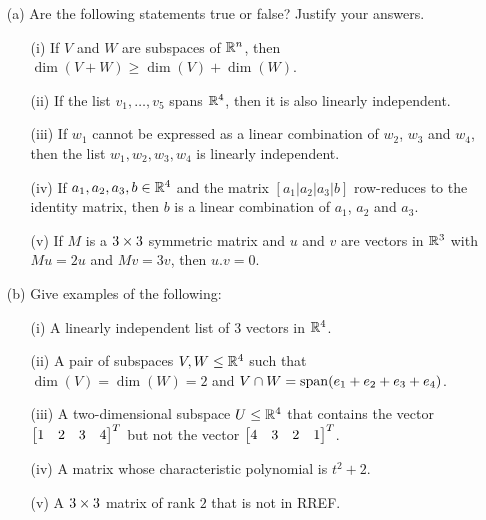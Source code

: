 \documentclass[a4paper]{article}
\begin{document}
\begin{problem}[2012-13 resit]
 \begin{itemize}
  \item[(a)] Are the following statements true or false?  Justify your
   answers. 
   \begin{itemize}
    \item[(i)] If $V$ and $W$ are subspaces of ${\mathbb{R}}^n$, then
     $\dim(V+W)\geq\dim(V)+\dim(W)$.
    \item[(ii)] If the list $v_1,\dotsc,v_5$ spans ${\mathbb{R}}^4$, then it is
     also linearly independent.
    \item[(iii)] If $w_1$ cannot be expressed as a linear combination of
     $w_2$, $w_3$ and $w_4$, then the list $w_1,w_2,w_3,w_4$ is
     linearly independent.
    \item[(iv)] If $a_1,a_2,a_3,b\in{\mathbb{R}}^4$ and the matrix
     $[a_1|a_2|a_3|b]$ row-reduces to the identity matrix, then $b$ is
     a linear combination of $a_1$, $a_2$ and $a_3$.
    \item[(v)] If $M$ is a $3\times 3$ symmetric matrix and $u$ and $v$
     are vectors in ${\mathbb{R}}^3$ with $Mu=2u$ and $Mv=3v$, then $u.v=0$.
   \end{itemize}
  \item[(b)] Give examples of the following: 
   \begin{itemize}
    \item[(i)] A linearly independent list of $3$ vectors in ${\mathbb{R}}^4$.
    \item[(ii)] A pair of subspaces $V,W\leq{\mathbb{R}}^4$ such that
     $\dim(V)=\dim(W)=2$ and $V\cap W=\operatorname{span}(e_1+e_2+e_3+e_4)$.
    \item[(iii)] A two-dimensional subspace $U\leq{\mathbb{R}}^4$ that contains
     the vector $\left[\begin{matrix} 1&2&3&4\end{matrix}\right]^T$ but not the vector 
     $\left[\begin{matrix} 4&3&2&1\end{matrix}\right]^T$.
    \item[(iv)] A matrix whose characteristic polynomial
     is $t^2+2$.
    \item[(v)] A $3\times 3$ matrix of rank $2$ that is not in RREF.
   \end{itemize}
 \end{itemize}
\end{problem}
\end{document}
